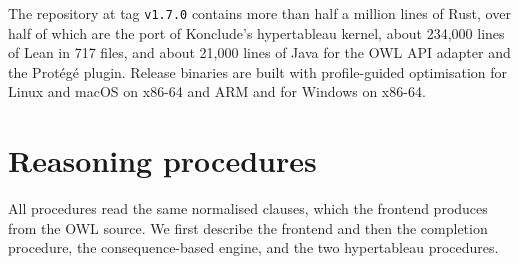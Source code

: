 The repository at tag \texttt{v1.7.0} contains more than half a million lines
of Rust, over half of which are the port of Konclude's hypertableau kernel,
about 234,000 lines of Lean in 717 files, and about 21,000 lines of Java for
the OWL API adapter and the Prot\'eg\'e plugin.    Release binaries are built with
profile-guided optimisation for Linux and macOS on x86-64 and ARM and for
Windows on x86-64.

\section{Reasoning procedures}
\label{sec:procedures}

All procedures read the same normalised clauses, which the frontend produces
from the OWL source.  We first describe the frontend and then the \EL{}
completion procedure, the consequence-based engine, and the two hypertableau
procedures.

